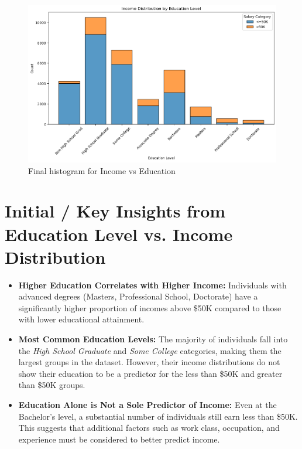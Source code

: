 \documentclass[journal]{IEEEtran}
\begin{document}
\begin{figure}[h]
    \centering
    \includegraphics[width=\columnwidth]{hist_4.png}  %
    \caption{Final histogram for Income vs Education}
    \label{fig:Final histogram for Income vs Education}
\end{figure}


\section{Initial / Key Insights from Education Level vs. Income Distribution}

\begin{itemize}
    \item \textbf{Higher Education Correlates with Higher Income:} Individuals with advanced degrees (Masters, Professional School, Doctorate) have a significantly higher proportion of incomes above \$50K compared to those with lower educational attainment.
    
    \item \textbf{Most Common Education Levels:} The majority of individuals fall into the \textit{High School Graduate} and \textit{Some College} categories, making them the largest groups in the dataset. However, their income distributions do not show their education to be a predictor for the less than \$50K and greater than \$50K groups.
    
    \item \textbf{Education Alone is Not a Sole Predictor of Income:} Even at the Bachelor's level, a substantial number of individuals still earn less than \$50K. This suggests that additional factors such as work class, occupation, and experience must be considered to better predict income.
\end{itemize}
\end{document}
